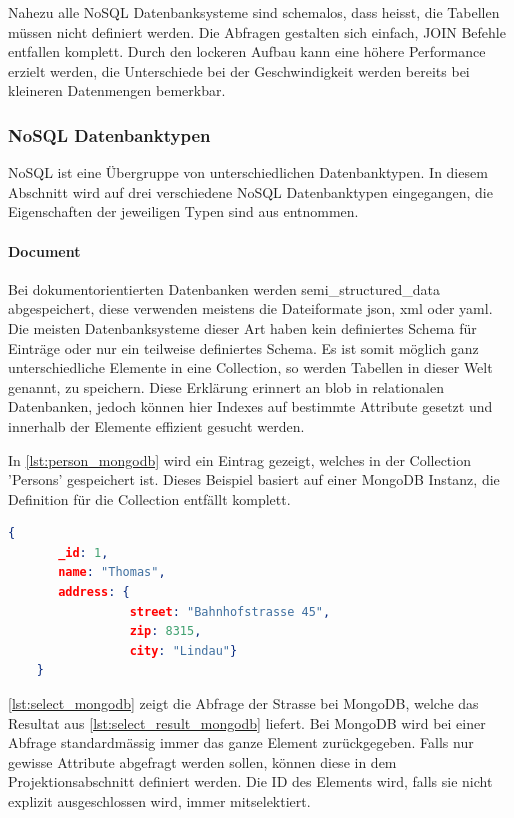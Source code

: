 Nahezu alle NoSQL Datenbanksysteme sind schemalos, dass heisst, die Tabellen müssen nicht definiert werden. Die Abfragen gestalten sich einfach, JOIN Befehle entfallen 
komplett. Durch den lockeren Aufbau kann eine höhere Performance erzielt werden, die Unterschiede bei der Geschwindigkeit werden bereits bei kleineren Datenmengen bemerkbar.

\subsubsection{NoSQL Datenbanktypen}\label{no_sql_db_subgroups}
NoSQL ist eine Übergruppe von unterschiedlichen Datenbanktypen. In diesem Abschnitt wird auf drei verschiedene NoSQL Datenbanktypen eingegangen, die Eigenschaften der jeweiligen
 Typen sind aus \cite{vaish2013getting} entnommen.

\paragraph{Document}
Bei dokumentorientierten Datenbanken werden \gls{semi_structured_data} abgespeichert, diese verwenden meistens die Dateiformate \gls{json}, 
\gls{xml} oder \gls{yaml}. Die meisten Datenbanksysteme dieser Art haben kein definiertes Schema für Einträge oder 
nur ein teilweise definiertes Schema. Es ist somit möglich ganz unterschiedliche Elemente in eine Collection, so werden Tabellen in dieser Welt genannt, zu speichern. Diese Erklärung 
erinnert an \gls{blob} in relationalen Datenbanken, jedoch können hier Indexes auf bestimmte Attribute gesetzt und innerhalb der Elemente effizient gesucht 
werden.

In \autoref{lst:person_mongodb} wird ein Eintrag gezeigt, welches in der Collection 'Persons' gespeichert ist. Dieses Beispiel basiert auf einer MongoDB Instanz, die Definition 
für die Collection entfällt komplett.

\begin{lstlisting}[language=JSON, caption=Personen Element in JSON Format, label=lst:person_mongodb]  
    {
       _id: 1,
       name: "Thomas",
       address: {
                 street: "Bahnhofstrasse 45",
                 zip: 8315,
                 city: "Lindau"}
    }
\end{lstlisting}

\autoref{lst:select_mongodb} zeigt die Abfrage der Strasse bei MongoDB, welche das Resultat aus \autoref{lst:select_result_mongodb} liefert. Bei MongoDB wird bei einer Abfrage standardmässig 
immer das ganze Element zurückgegeben. Falls nur gewisse Attribute abgefragt werden sollen, können diese in dem Projektionsabschnitt definiert werden. Die ID des Elements wird, falls 
sie nicht explizit ausgeschlossen wird, immer mitselektiert.

